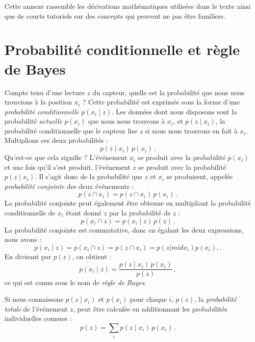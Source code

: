 Cette annexe rassemble les dérivations mathématiques utilisées dans le texte ainsi que de courts tutoriels sur des concepts qui peuvent ne pas être familiers.

\section{Probabilité conditionnelle et règle de Bayes}\label{a.bayes}

Compte tenu d'une lecture $z$ du capteur, quelle est la probabilité que nous nous trouvions à la position $x_i$ ? Cette probabilité est exprimée sous la forme d'une \emph{probabilité conditionnelle} $p(x_i\mid z)$. Les données dont nous disposons sont la probabilité \emph{actuelle} $p(x_i)$ que nous nous trouvons à $x_i$, et $p(z\mid x_i)$, la probabilité conditionnelle que le capteur lise $z$ si nous nous trouvons en fait à $x_i$. Multiplions ces deux probabilités :
\[
p(z\mid x_i)\, p(x_i)\,.
\]
Qu'est-ce que cela signifie ? L'événement $x_i$ se produit avec la probabilité $p(x_i)$ et une fois qu'il s'est produit, l'événement $z$ se produit avec la probabilité $p(z\mid x_i)$. Il s'agit donc de la probabilité que $z$ et $x_i$ se produisent, appelée \emph{probabilité conjointe} des deux événements :
\[
p(z \cap x_i) = p(z\cap x_i)\, p(x_i)\,.
\]
La probabilité conjointe peut également être obtenue en multipliant la probabilité conditionnelle de $x_i$ étant donné $z$ par la probabilité de $z$ :
\[
p(x_i \cap z) = p(x_i\mid z)\, p(z)\,.
\]
La probabilité conjointe est commutative, donc en égalant les deux expressions, nous avons :
\[
p(x_i \mid z) = p(x_i \cap z) = p(z\cap x_i)= p(z|mid x_i)p(x_i),.
\]
En divisant par $p(z)$, on obtient :
\[
p(x_i\mid z)= \frac{p(z\mid x_i)\, p(x_i)}{p(z)}\,,
\]
ce qui est connu sous le nom de \emph{règle de Bayes}.

Si nous connaissons $p(z\mid x_i)$ et $p(x_i)$ pour chaque $i$, $p(z)$, la \emph{probabilité totale} de l'événement $z$, peut être calculée en additionnant les probabilités individuelles connues :
\begin{displaymath}
p(z) = \sum_i p(z\mid x_i)\, p(x_i)\,.
\end{displaymath}

